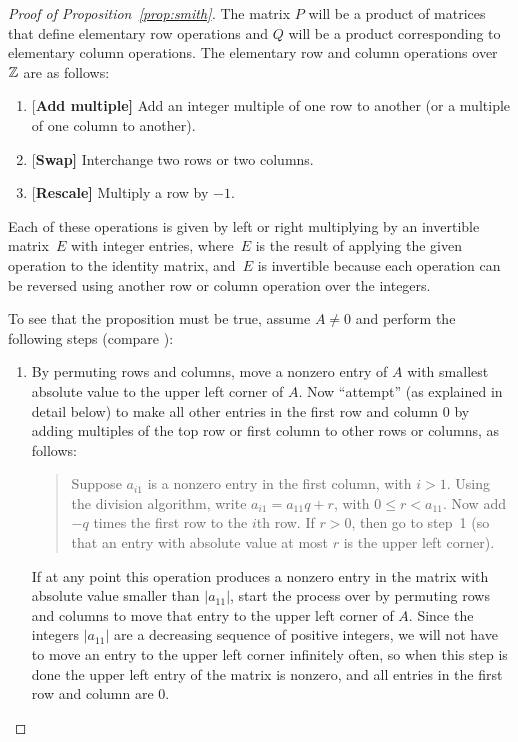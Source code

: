 \begin{proof}[Proof of Proposition~\ref{prop:smith}]  The matrix $P$ will be a product of matrices that define elementary
  row operations and $Q$ will be a product corresponding to elementary
  column operations.  The elementary row and column operations over
  $\mathbb{Z}$ are as follows:
\begin{enumerate}
\item{}{[\bf Add multiple]} Add an integer multiple of one row to another (or a multiple
of one column to another).
\item{}{[\bf Swap]} Interchange two rows or two columns.
\item{}{[\bf Rescale]} Multiply a row by $-1$.
\end{enumerate}
Each of these operations is given by left or right multiplying by an
invertible matrix~$E$ with integer entries, where~$E$ is the result of
applying the given operation to the identity matrix, and~$E$ is
invertible because each operation can be reversed using another row or
column operation over the integers.

To see that the proposition must be true, assume $A\neq 0$ and perform
the following steps (compare \cite[Pg.~459]{artin:algebra}):
\begin{enumerate}
\item By permuting rows and columns, move a nonzero entry of $A$ with
  smallest absolute value to the upper left corner of $A$.  Now
  ``attempt'' (as explained in detail below) to make all other entries
  in the first row and column $0$ by adding multiples of the top row
  or first column to other rows or columns, as follows:
\begin{quote}
Suppose $a_{i1}$ is a nonzero entry in the first column, with
$i>1$.  Using the division algorithm, write $a_{i1} = a_{11}q + r$,
with $0\leq r < a_{11}$.  Now add $-q$ times the first row to the
$i$th row.  If $r>0$, then go to step~1 (so that an entry with
absolute value at most $r$ is the upper left corner).  
\end{quote}
  If at any point this operation produces a nonzero entry in the
  matrix with absolute value smaller than $|a_{11}|$, start the
  process over by permuting rows and columns to move that entry to the
  upper left corner of $A$.  Since the integers $|a_{11}|$ are a
  decreasing sequence of positive integers, we will not have to move
  an entry to the upper left corner infinitely often, so when this
  step is done the upper left entry of the matrix is nonzero, and all
  entries in the first row and column are 0.



\end{enumerate}
\end{proof}
